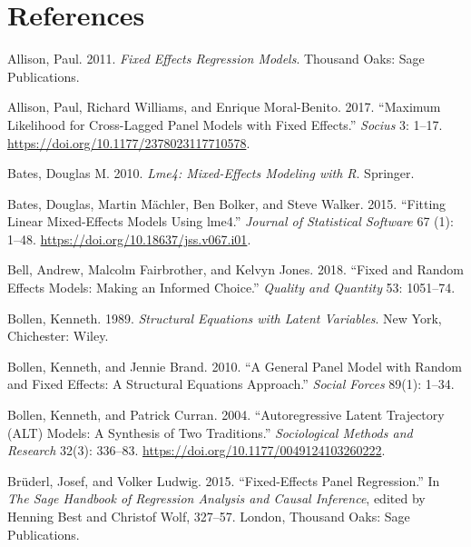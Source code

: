 \documentclass[
  12pt,
  a4paper]{article}
\begin{document}
\newpage

\hypertarget{references}{%
\section*{References}\label{references}}

\hypertarget{refs}{}
\leavevmode\hypertarget{ref-Allison2011}{}%
Allison, Paul. 2011. \emph{Fixed Effects Regression Models}. Thousand
Oaks: Sage Publications.

\leavevmode\hypertarget{ref-Allison2017}{}%
Allison, Paul, Richard Williams, and Enrique Moral-Benito. 2017.
``Maximum Likelihood for Cross-Lagged Panel Models with Fixed Effects.''
\emph{Socius} 3: 1--17. \url{https://doi.org/10.1177/2378023117710578}.

\leavevmode\hypertarget{ref-Bates2010}{}%
Bates, Douglas M. 2010. \emph{Lme4: Mixed-Effects Modeling with R}.
Springer.

\leavevmode\hypertarget{ref-R-lme4}{}%
Bates, Douglas, Martin Mächler, Ben Bolker, and Steve Walker. 2015.
``Fitting Linear Mixed-Effects Models Using lme4.'' \emph{Journal of
Statistical Software} 67 (1): 1--48.
\url{https://doi.org/10.18637/jss.v067.i01}.

\leavevmode\hypertarget{ref-Bell2018}{}%
Bell, Andrew, Malcolm Fairbrother, and Kelvyn Jones. 2018. ``Fixed and
Random Effects Models: Making an Informed Choice.'' \emph{Quality and
Quantity} 53: 1051--74.

\leavevmode\hypertarget{ref-Bollen1989}{}%
Bollen, Kenneth. 1989. \emph{Structural Equations with Latent
Variables}. New York, Chichester: Wiley.

\leavevmode\hypertarget{ref-Bollen2010}{}%
Bollen, Kenneth, and Jennie Brand. 2010. ``A General Panel Model with
Random and Fixed Effects: A Structural Equations Approach.''
\emph{Social Forces} 89(1): 1--34.

\leavevmode\hypertarget{ref-Bollen2004}{}%
Bollen, Kenneth, and Patrick Curran. 2004. ``Autoregressive Latent
Trajectory (ALT) Models: A Synthesis of Two Traditions.''
\emph{Sociological Methods and Research} 32(3): 336--83.
\url{https://doi.org/10.1177/0049124103260222}.

\leavevmode\hypertarget{ref-Bruederl2015}{}%
Brüderl, Josef, and Volker Ludwig. 2015. ``Fixed-Effects Panel
Regression.'' In \emph{The Sage Handbook of Regression Analysis and
Causal Inference}, edited by Henning Best and Christof Wolf, 327--57.
London, Thousand Oaks: Sage Publications.
\end{document}
